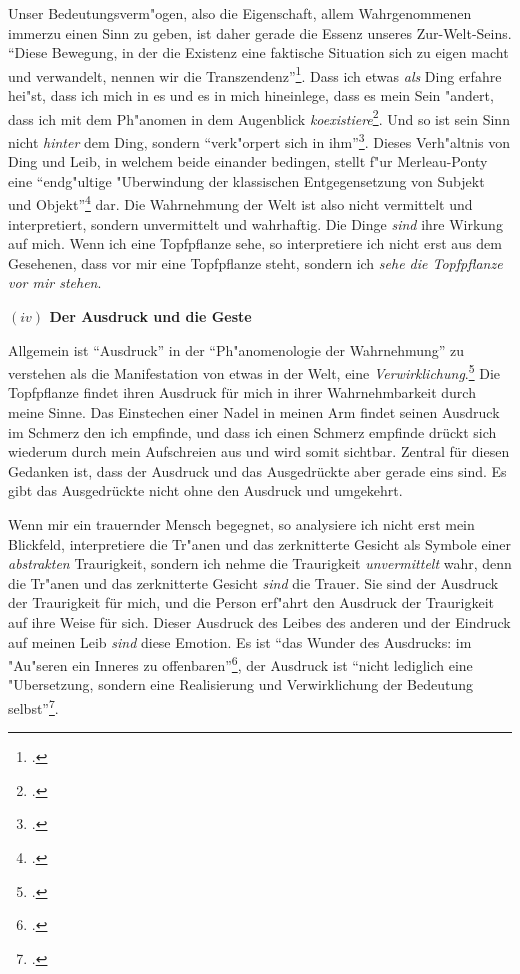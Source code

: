 \documentclass[a4paper, 12pt]{article}
\begin{document}
\begin{onehalfspace}
Unser Bedeutungsverm"ogen, also die Eigenschaft, allem Wahrgenommenen immerzu einen Sinn zu geben, ist daher gerade die Essenz unseres Zur-Welt-Seins. "`Diese Bewegung, in der die Existenz eine faktische Situation sich zu eigen macht und verwandelt, nennen wir die Transzendenz"'\footnote{\Cite[Siehe][S. 202]{merleau1966phanomenologie}.}. Dass ich etwas \emph{als} Ding erfahre hei"st, dass ich mich in es und es in mich hineinlege, dass es mein Sein "andert, dass ich mit dem Ph"anomen in dem Augenblick \emph{koexistiere}\footnote{\Cite[Vgl.][S. 368]{merleau1966phanomenologie}.}. Und so ist sein Sinn nicht \emph{hinter} dem Ding, sondern "`verk"orpert sich in ihm"'\footnote{\Cite[Siehe][S. 370]{merleau1966phanomenologie}.}. Dieses Verh"altnis von Ding und Leib, in welchem beide einander bedingen, stellt f"ur Merleau-Ponty eine "`endg"ultige "Uberwindung der klassischen Entgegensetzung von Subjekt und Objekt"'\footnote{\Cite[Siehe][S. 207]{merleau1966phanomenologie}.} dar. Die Wahrnehmung der Welt ist also nicht vermittelt und interpretiert, sondern unvermittelt und wahrhaftig. Die Dinge \emph{sind} ihre Wirkung auf mich. Wenn ich eine Topfpflanze sehe, so interpretiere ich nicht erst aus dem Gesehenen, dass vor mir eine Topfpflanze steht, sondern ich \emph{sehe die Topfpflanze vor mir stehen}.

\vspace{5mm}

\noindent\textbf{$(iv)$ Der Ausdruck und die Geste}

\noindent Allgemein ist "`Ausdruck"' in der "`Ph"anomenologie der Wahrnehmung"' zu verstehen als die Manifestation von etwas in der Welt, eine \emph{Verwirklichung}.\footnote{\Cite[Vgl.][S. 217]{merleau1966phanomenologie}.} Die Topfpflanze findet ihren Ausdruck für mich in ihrer Wahrnehmbarkeit durch meine Sinne. Das Einstechen einer Nadel in meinen Arm findet seinen Ausdruck im Schmerz den ich empfinde, und dass ich einen Schmerz empfinde drückt sich wiederum durch mein Aufschreien aus und wird somit sichtbar. Zentral für diesen Gedanken ist, dass der Ausdruck und das Ausgedrückte aber gerade eins sind. Es gibt das Ausgedrückte nicht ohne den Ausdruck und umgekehrt. 

Wenn mir ein trauernder Mensch begegnet, so analysiere ich nicht erst mein Blickfeld, interpretiere die Tr"anen und das zerknitterte Gesicht als Symbole einer \emph{abstrakten} Traurigkeit, sondern ich nehme die Traurigkeit \emph{unvermittelt} wahr, denn die Tr"anen und das zerknitterte Gesicht \emph{sind} die Trauer. Sie sind der Ausdruck der Traurigkeit für mich, und die Person erf"ahrt den Ausdruck der Traurigkeit auf ihre Weise für sich. Dieser Ausdruck des Leibes des anderen und der Eindruck auf meinen Leib \emph{sind} diese Emotion. Es ist "`das Wunder des Ausdrucks: im "Au"seren ein Inneres zu offenbaren"'\footnote{\Cite[Siehe][S. 370]{merleau1966phanomenologie}.}, der Ausdruck ist "`nicht lediglich eine "Ubersetzung, sondern eine Realisierung und Verwirklichung der Bedeutung selbst"'\footnote{\Cite[Siehe][S. 217]{merleau1966phanomenologie}.}. 


\end{onehalfspace}
\end{document}
